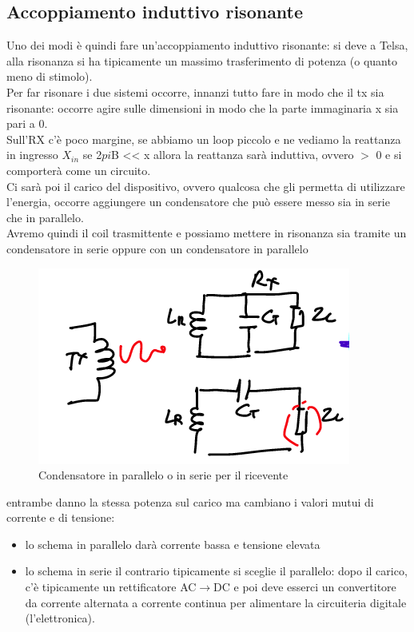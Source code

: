 \documentclass[oneside, 12pt]{extbook}
\begin{document}
\subsection{Accoppiamento induttivo risonante}
Uno dei modi è quindi fare un'accoppiamento induttivo risonante: si deve a Telsa, alla risonanza si ha tipicamente un massimo trasferimento di potenza (o quanto meno di stimolo).\\Per far risonare i due sistemi occorre, innanzi tutto fare in modo che il tx sia risonante: occorre agire sulle dimensioni in modo che la parte immaginaria x sia pari a 0.\\Sull'RX c'è poco margine, se abbiamo un loop piccolo e ne vediamo la reattanza in ingresso $X_{in}$ se 2$pi$B << x allora la reattanza sarà induttiva, ovvero $>$ 0 e si comporterà come un circuito.\\Ci sarà poi il carico del dispositivo, ovvero qualcosa che gli permetta di utilizzare l'energia, occorre aggiungere un condensatore che può essere messo sia in serie che in parallelo.\\Avremo quindi il coil trasmittente e possiamo mettere in risonanza sia tramite un condensatore in serie oppure con un condensatore in parallelo 
\begin{figure}[!h]
	\includegraphics[scale=1]{immagini/cond_ser_parall.png}
	\caption{Condensatore in parallelo o in serie per il ricevente}
\end{figure}
 entrambe danno la stessa potenza sul carico ma cambiano i valori mutui di corrente e di tensione:
 \begin{itemize}
 	\item lo schema in parallelo darà corrente bassa e tensione elevata
 	\item lo schema in serie il contrario
 	tipicamente si sceglie il parallelo: dopo il carico, c'è tipicamente un rettificatore AC$\rightarrow$DC e poi deve esserci un convertitore da corrente alternata a corrente continua per alimentare la circuiteria digitale (l'elettronica).
 \end{itemize}
\end{document}
